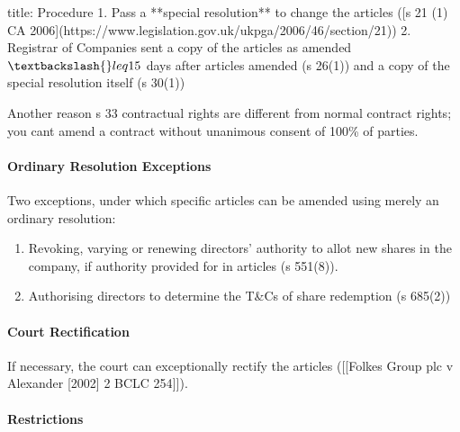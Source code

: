 \documentclass[
]{article}
\newenvironment{Shaded}{}{}
\newcommand{\NormalTok}[1]{#1}
\providecommand{\tightlist}{%
  \setlength{\itemsep}{0pt}\setlength{\parskip}{0pt}}
\begin{document}
\begin{Shaded}
\begin{Highlighting}[]
\NormalTok{title: Procedure}
\NormalTok{1. Pass a **special resolution** to change the articles ([s 21 (1) CA 2006](https://www.legislation.gov.uk/ukpga/2006/46/section/21))}
\NormalTok{2. Registrar of Companies sent a copy of the articles as amended $\textbackslash{}leq 15$ days after articles amended (s 26(1)) and a copy of the special resolution itself (s 30(1))}
\end{Highlighting}
\end{Shaded}

\begin{Shaded}
\begin{Highlighting}[]
\NormalTok{Another reason s 33 contractual rights are different from normal contract rights; you can\textquotesingle{}t amend a contract without unanimous consent of 100\% of parties.}
\end{Highlighting}
\end{Shaded}

\hypertarget{ordinary-resolution-exceptions}{%
\paragraph{Ordinary Resolution
Exceptions}\label{ordinary-resolution-exceptions}}

Two exceptions, under which specific articles can be amended using
merely an ordinary resolution:

\begin{enumerate}
\def\labelenumi{\arabic{enumi}.}
\tightlist
\item
  Revoking, varying or renewing directors' authority to allot new shares
  in the company, if authority provided for in articles (s 551(8)).
\item
  Authorising directors to determine the T\&Cs of share redemption (s
  685(2))
\end{enumerate}

\hypertarget{court-rectification}{%
\paragraph{Court Rectification}\label{court-rectification}}

If necessary, the court can exceptionally rectify the articles
({[}{[}Folkes Group plc v Alexander {[}2002{]} 2 BCLC 254{]}{]}).

\hypertarget{restrictions}{%
\paragraph{Restrictions}\label{restrictions}}
\end{document}

